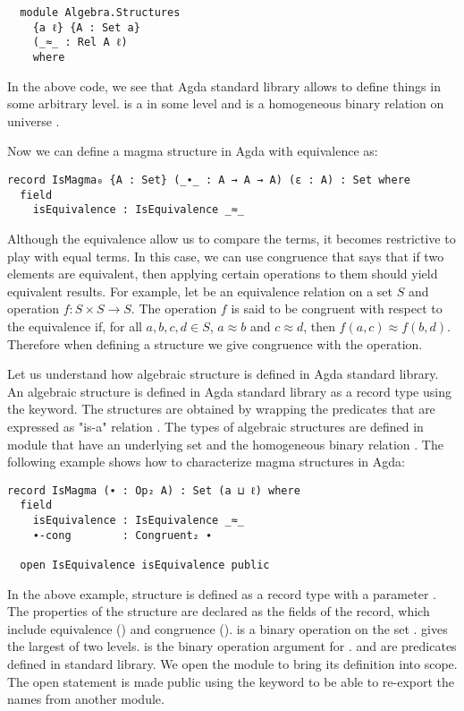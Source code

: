 \begin{verbatim}
  module Algebra.Structures
    {a ℓ} {A : Set a} 
    (_≈_ : Rel A ℓ)    
    where
  \end{verbatim} 

In the above code, we see that Agda standard library allows to define things in
some arbitrary level.  is a  in some level  and
 is a homogeneous binary relation  on universe .

Now we can define a magma structure in Agda with equivalence as:

\begin{verbatim}
record IsMagma₀ {A : Set} (_∙_ : A → A → A) (ε : A) : Set where
  field
    isEquivalence : IsEquivalence _≈_
\end{verbatim}

Although the equivalence allow us to compare the terms, it becomes restrictive
to play with equal terms. In this case, we can use congruence  that says that if
two elements are equivalent, then applying certain operations to them should
yield equivalent results. For example, let  be an equivalence relation
on a set $S$ and operation $f : S × S → S$. The operation $f$ is said to be
congruent with respect to the equivalence if, for all $a, b, c, d \in S$, $a ≈
b$ and $c ≈ d$, then $f(a, c) ≈ f(b, d)$. Therefore when defining a structure we
give congruence with the operation.

Let us understand how algebraic structure is defined in Agda standard library.
An algebraic structure is defined in Agda standard library as a record type
using the  keyword. The structures are obtained by wrapping the
predicates that are expressed as "is-a" relation \cite{hu2021formalizing}. The
types of algebraic structures are defined in module 
that have an underlying set  and the homogeneous binary relation
. The following example shows how to characterize magma structures in
Agda:

\begin{verbatim}
record IsMagma (∙ : Op₂ A) : Set (a ⊔ ℓ) where
  field
    isEquivalence : IsEquivalence _≈_
    ∙-cong        : Congruent₂ ∙

  open IsEquivalence isEquivalence public
\end{verbatim}

In the above example, structure  is defined as a record type
with a parameter . The properties of the structure
 are declared as the fields of the record, which include
equivalence () and congruence ().
 is a binary operation on the set .  gives the
largest of two levels.  is the binary operation argument for
.  and  are
predicates defined in standard library. We open the module
 to bring its definition into scope. The open statement is
made public using the keyword  to be able to re-export the names
from another module.

